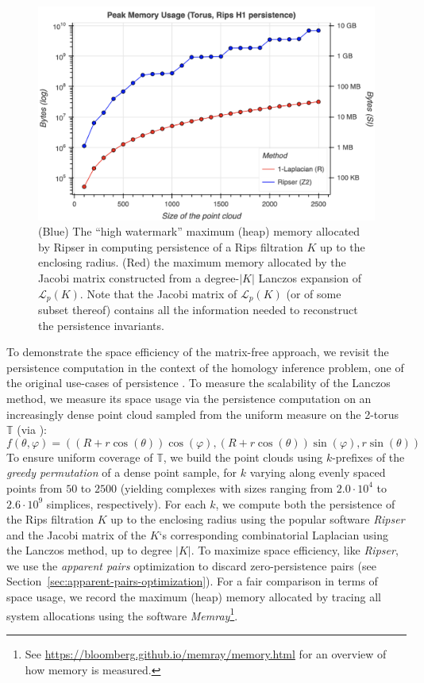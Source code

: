 \documentclass[pdflatex,sn-mathphys-num]{sn-jnl}
\begin{document}
\begin{figure}
\centering
\includegraphics[width=0.65\linewidth,height=\textheight,keepaspectratio]{../images/ripser_vs_laplacian.png}
\caption{(Blue) The ``high watermark'' maximum (heap) memory allocated by Ripser in computing persistence of a Rips filtration \(K\) up to the enclosing radius. (Red) the maximum memory allocated by the Jacobi matrix constructed from a degree-\(|K|\) Lanczos expansion of \(\mathcal{L}_{p}(K)\). Note that the Jacobi matrix of \(\mathcal{L}_{p}(K)\) (or of some subset thereof) contains all the information needed to reconstruct the persistence invariants.}
\end{figure}

\label{fig:ripser_vs_laplacian}{}

To demonstrate the space efficiency of the matrix-free approach, we revisit the persistence computation in the context of the homology inference problem, one of the original use-cases of persistence \cite{perea2018brief}. To measure the scalability of the Lanczos method, we measure its space usage via the persistence computation on an increasingly dense point cloud sampled from the uniform measure on the 2-torus \(\mathbb{T}\) (via \cite{diaconis2013sampling}): 
\[
f(\theta,\varphi) = \left( \left( R + r\cos(\theta) \right)\cos(\varphi),\left( R + r\cos(\theta) \right)\sin(\varphi),r\sin(\theta) \right)
\]
\noindent
To ensure uniform coverage of \(\mathbb{T}\), we build the point clouds using \(k\)-prefixes of the \emph{greedy permutation} of a dense point sample, for \(k\) varying along evenly spaced points from \(50\) to \(2500\) (yielding complexes with sizes ranging from \(2.0 \cdot 10^{4}\) to \(2.6 \cdot 10^{9}\) simplices, respectively). For each \(k\), we compute both the persistence of the Rips filtration \(K\) up to the enclosing radius using the popular software \emph{Ripser} \cite{bauer2021ripser} and the Jacobi matrix of the \(K\)`s corresponding combinatorial Laplacian using the Lanczos method, up to degree \(|K|\). To maximize space efficiency, like \emph{Ripser}, we use the \emph{apparent pairs} optimization to discard zero-persistence pairs (see Section~\ref{sec:apparent-pairs-optimization}). For a fair comparison in terms of space usage, we record the maximum (heap) memory allocated by tracing all system allocations using the software \emph{Memray}\footnote{See \url{https://bloomberg.github.io/memray/memory.html} for an overview of how memory is measured.}.
\end{document}
